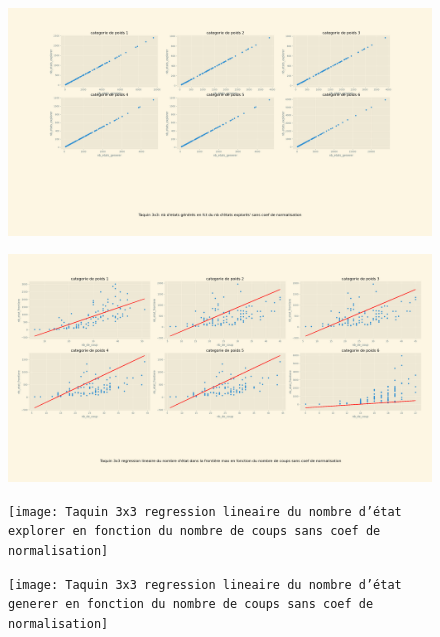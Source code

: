 \documentclass[a4paper, 12pt]{article}
\begin{document}
\begin{figure}[H]
    \centering
    \includegraphics[width=\textwidth]{Taquin 3x3 nombre d'etats generer en fct du nb d etat explorer sans coef}
\end{figure}

\begin{figure}[H]
    \centering
    \includegraphics[width=\textwidth]{Taquin 3x3 regression lineaire du nombre d'état dans la frontière max en fonction du nombre de coups sans coef de normalisation}
\end{figure}

\begin{figure}[H]
    \centering
    \texttt{[image: Taquin 3x3 regression lineaire du nombre d'état explorer en fonction du nombre de coups sans coef de normalisation]}
\end{figure}

\begin{figure}[H]
    \centering
    \texttt{[image: Taquin 3x3 regression lineaire du nombre d'état generer en fonction du nombre de coups sans coef de normalisation]}
\end{figure}
\end{document}
